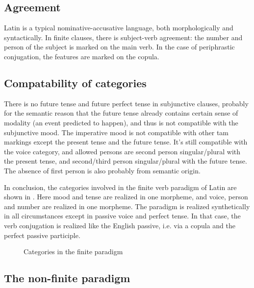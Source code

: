 \documentclass[a4paper, oneside, 12pt]{report}
\begin{document}
\subsection{Agreement}\label{sec:agreement-abs}

Latin is a typical nominative-accusative language,
both morphologically and syntactically.
In finite clauses, 
there is subject-verb agreement:
the number and person of the subject is marked on the main verb.
In the case of periphrastic conjugation,
the features are marked on the copula.

\subsection{Compatability of categories}

There is no \acl{future} tense and \acl{future perfect} tense in subjunctive clauses,
probably for the semantic reason
that the future tense already contains certain sense of modality
(an event predicted to happen),
and thus is not compatible with the \acl{subjunctive} mood.
The \acl{imperative} mood is not compatible with other \ac{tam} markings
except the \acl{present} tense and the \acl{future} tense.
It's still compatible with the voice category,
and allowed persons are 
second person singular/plural with the \acl{present} tense,
and second/third person singular/plural with the \acl{future} tense.
The absence of first person is also probably from semantic origin.

In conclusion, the categories involved in the finite verb paradigm of Latin 
are shown in .
Here mood and tense are realized in one morpheme,
and voice, person and number are realized in one morpheme.
The paradigm is realized synthetically in all circumstances 
except in passive voice and perfect tense.
In that case, the verb conjugation is realized like the English passive,
i.e. via a copula and the perfect passive participle.

\begin{figure}[H]
    \centering
    
    \caption{Categories in the finite paradigm}
    \label{fig:paradigm-finite-verb}
\end{figure}


\subsection{The non-finite paradigm}\label{sec:non-finite-abs}
\end{document}
